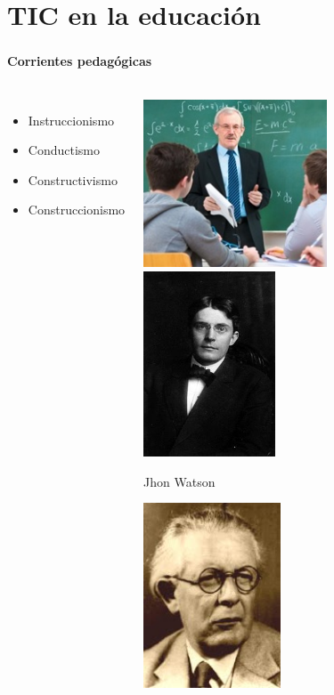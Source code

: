 \section{TIC en la educación}
\setcounter{sectiontotal}{3}

\begin{frame}
    \frametitle{\pagetitle}
    \framesubtitle{Corrientes pedagógicas}

    \pause{}
\begin{columns}

 \hspace{0.5cm}
\begin{itemize}[<+->]
	\item Instruccionismo
	\item Conductismo
	\item Constructivismo
	\item Construccionismo
\end{itemize}

 \hspace{0.5cm}
\begin{overprint}
     \includegraphics[width=\textwidth, height=5cm]{imagenes/tradicional} 
     \includegraphics[width=\textwidth, height=5.5cm]{imagenes/conductismo} 
    
    \centering
    Jhon Watson
    
     \includegraphics[width=\textwidth, height=5.5cm]{imagenes/constructivismo} 


\end{overprint}
\end{columns}
\end{frame}
